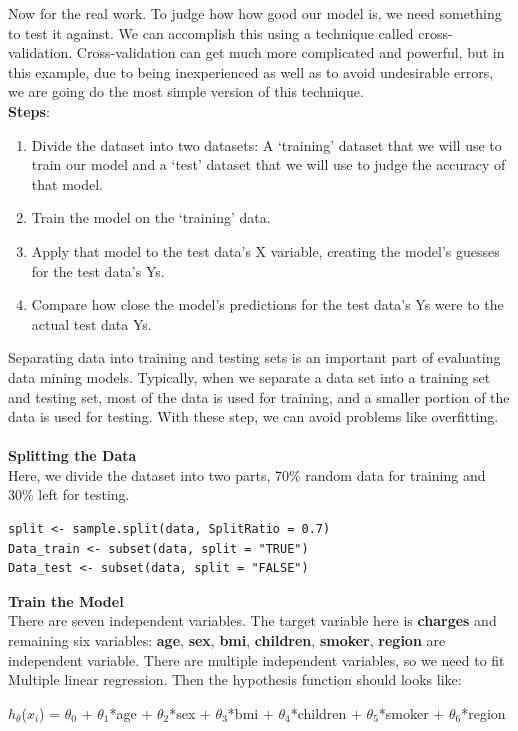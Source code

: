 \documentclass[a4paper]{article}
\begin{document}
Now for the real work. To judge how how good our model is, we need something to test it against. We can accomplish this using a technique called cross-validation. Cross-validation can get much more complicated and powerful, but in this example, due to being inexperienced as well as to avoid undesirable errors, we are going do the most simple version of this technique. \\
\textbf{Steps}:
\begin{enumerate}
    \item Divide the dataset into two datasets: A ‘training’ dataset that we will use to train our model and a ‘test’ dataset that we will use to judge the accuracy of that model.
    \item Train the model on the ‘training’ data.
    \item Apply that model to the test data’s X variable, creating the model’s guesses for the test data’s Ys.
    \item Compare how close the model’s predictions for the test data’s Ys were to the actual test data Ys.
\end{enumerate}
Separating data into training and testing sets is an important part of evaluating data mining models. Typically, when we separate a data set into a training set and testing set, most of the data is used for training, and a smaller portion of the data is used for testing. With these step, we can avoid problems like overfitting. \\ \\
\textbf{Splitting the Data} \\
Here, we divide the dataset into two parts, 70\% random data for training and 30\% left for testing.
\begin{lstlisting}
split <- sample.split(data, SplitRatio = 0.7)
Data_train <- subset(data, split = "TRUE")
Data_test <- subset(data, split = "FALSE")
\end{lstlisting}
\textbf{Train the Model} \\
There are seven independent variables. The target variable here is \textbf{charges} and remaining six variables: \textbf{age}, \textbf{sex}, \textbf{bmi}, \textbf{children}, \textbf{smoker}, \textbf{region} are independent variable. There are multiple independent variables, so we need to fit Multiple linear regression. Then the hypothesis function should looks like:
\begin{center}
    $h_\theta$($x_i$) = $\theta_0$ + $\theta_1$*age + $\theta_2$*sex + $\theta_3$*bmi + $\theta_4$*children + $\theta_5$*smoker + $\theta_6$*region
\end{center}
\end{document}
